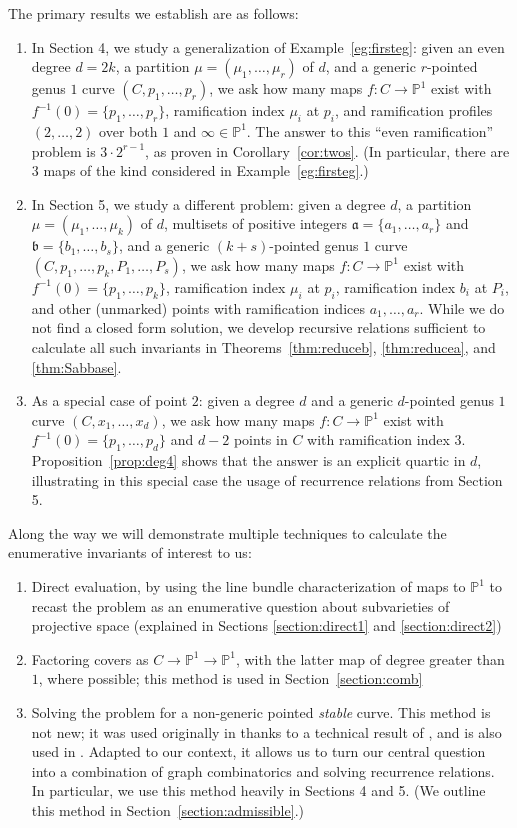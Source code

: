 \documentclass[thesis]{thesis-umich}           %
\renewcommand{\a}{\mathfrak a}
\renewcommand{\b}{\mathfrak b}
\renewcommand{\P}{\mathbb P}
\theoremstyle{definition}
\begin{document}
The primary results we establish are as follows:
\begin{enumerate}
\item In Section 4, we study a generalization of Example~\ref{eg:firsteg}: given
  an even degree $d=2k$, a partition $\mu=(\mu_1,\dots,\mu_r)$ of $d$, and a generic
  $r$-pointed genus $1$ curve $(C,p_1,\dots,p_r)$, we ask how many maps
  $f:C\to\P^1$ exist with $f^{-1}(0)=\{p_1,\dots,p_r\}$, ramification index $\mu_i$
  at $p_i$, and ramification profiles $(2,\dots,2)$ over both $1$ and $\infty\in\P^1$.
  The answer to this ``even ramification'' problem is $3\cdot 2^{r-1}$, as
  proven in Corollary~\ref{cor:twos}. (In particular, there are $3$ maps of
  the kind considered in Example~\ref{eg:firsteg}.)
\item In Section 5, we study a different problem: given
  a degree $d$, a partition $\mu=(\mu_1,\dots,\mu_k)$ of $d$, multisets of positive integers $\a=\{a_1,\dots,a_r\}$ and $\b=\{b_1,\dots,b_s\}$,
  and a generic $(k+s)$-pointed genus $1$ curve $(C,p_1,\dots,p_k,P_1,\dots,P_s)$,
  we ask how many maps $f:C\to\P^1$ exist with $f^{-1}(0)=\{p_1,\dots,p_k\}$, ramification
  index $\mu_i$ at $p_i$, ramification index $b_i$ at $P_i$, and other (unmarked) points
  with ramification indices $a_1,\dots,a_r$.
  While we do not find a closed form solution, we develop recursive relations sufficient
  to calculate all such invariants in Theorems~\ref{thm:reduceb}, \ref{thm:reducea}, and \ref{thm:Sabbase}.
\item As a special case of point $2$: given a degree $d$ and a generic $d$-pointed genus $1$ curve $(C,x_1,\dots,x_d)$, we ask
  how many maps $f:C\to\P^1$ exist with $f^{-1}(0)=\{p_1,\dots,p_d\}$ and $d-2$ points in $C$ with ramification index $3$. Proposition~\ref{prop:deg4} shows that the answer is an explicit quartic in $d$, illustrating in this special case the usage of recurrence relations from Section 5.
  
  \end{enumerate}

Along the way we will demonstrate multiple techniques to calculate the enumerative
invariants of interest to us:
\begin{enumerate}
\item Direct evaluation, by using the line bundle characterization of maps to $\P^1$ to recast the problem as an enumerative question about subvarieties of projective space (explained in Sections \ref{section:direct1} and \ref{section:direct2})
\item Factoring covers as $C\to\P^1\to\P^1$, with the latter map of degree greater than $1$, where possible; this method is used in Section~\ref{section:comb}
  \item Solving the problem for a non-generic pointed {\it stable} curve. This method is not new; it was used originally in \cite{Cela} thanks to a technical result of \cite{Lian}, and is also used in \cite{Generalized}. Adapted to our context, it allows us to turn our central question into a combination of graph combinatorics and solving recurrence relations. In particular, we use this method heavily in Sections 4 and 5. (We outline this method in Section~\ref{section:admissible}.)
  \end{enumerate}
\end{document}

